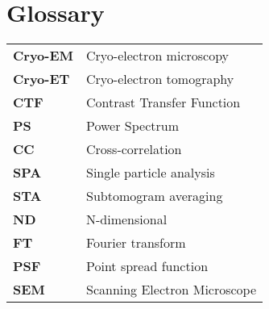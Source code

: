 \chapter{Glossary}

\renewcommand{\arraystretch}{1.5}

\begin{tabularx}{\linewidth}{>{\bf}l X}
Cryo-EM & Cryo-electron microscopy \\
Cryo-ET & Cryo-electron tomography \\
CTF & Contrast Transfer Function \\
PS & Power Spectrum \\
CC & Cross-correlation \\
SPA & Single particle analysis \\
STA & Subtomogram averaging \\
ND & N-dimensional \\
FT & Fourier transform \\
PSF & Point spread function \\
SEM & Scanning Electron Microscope \\
\end{tabularx}

